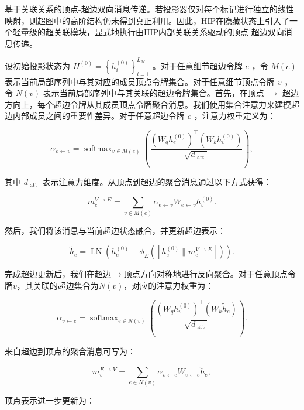 \documentclass[10pt]{article}
\begin{document}
基于关联关系的顶点-超边双向消息传递。若投影器仅对每个标记进行独立的线性映射，则超图中的高阶结构仍未得到真正利用。因此，HIP在隐藏状态上引入了一个轻量级的超关联模块，显式地执行由HIP内部关联关系驱动的顶点-超边双向消息传递。

设初始投影状态为 \({H}^{\left( 0\right) } = {\left\{  {h}_{i}^{\left( 0\right) }\right\}  }_{i = 1}^{{L}_{\mathcal{H}}}\) 。对于任意细节超边令牌 \(e\) ，令 \(M\left( e\right)\) 表示当前局部序列中与其对应的成员顶点令牌集合。对于任意细节顶点令牌 \(v\) ，令 \(N\left( v\right)\) 表示当前局部序列中与其关联的超边令牌集合。首先，在顶点 \(\rightarrow\) 超边方向上，每个超边令牌从其成员顶点令牌聚合消息。我们使用集合注意力来建模超边内部成员之间的重要性差异。对于任意超边令牌 \(e\) ，注意力权重定义为：

\[
{\alpha }_{e \leftarrow  v} = {\operatorname{softmax}}_{v \in  M\left( e\right) }\left( \frac{{\left( {W}_{q}{h}_{e}^{\left( 0\right) }\right) }^{\top }\left( {{W}_{k}{h}_{v}^{\left( 0\right) }}\right) }{\sqrt{{d}_{\text{ att }}}}\right) , \tag{5}
\]

其中 \({d}_{\text{ att }}\) 表示注意力维度。从顶点到超边的聚合消息通过以下方式获得：

\[
{m}_{e}^{V \rightarrow  E} = \mathop{\sum }\limits_{{v \in  M\left( e\right) }}{\alpha }_{e \leftarrow  v}{W}_{e \leftarrow  v}{h}_{v}^{\left( 0\right) }. \tag{6}
\]

然后，我们将该消息与当前超边状态融合，并更新超边表示：

\[
{\widetilde{h}}_{e} = \operatorname{LN}\left( {{h}_{e}^{\left( 0\right) } + {\phi }_{E}\left( \left\lbrack  {{h}_{e}^{\left( 0\right) }\parallel {m}_{e}^{V \rightarrow  E}}\right\rbrack  \right) }\right) . \tag{7}
\]

完成超边更新后，我们在超边\(\rightarrow\)顶点方向对称地进行反向聚合。对于任意顶点令牌\(v\)，其关联的超边集合为\(N\left( v\right)\)，对应的注意力权重为：

\[
{\alpha }_{v \leftarrow  e} = {\operatorname{softmax}}_{e \in  N\left( v\right) }\left( \frac{{\left( {W}_{q}{h}_{v}^{\left( 0\right) }\right) }^{\top }\left( {{W}_{k}{\widetilde{h}}_{e}}\right) }{\sqrt{{d}_{\text{ att }}}}\right) . \tag{8}
\]

来自超边到顶点的聚合消息可写为：

\[
{m}_{v}^{E \rightarrow  V} = \mathop{\sum }\limits_{{e \in  N\left( v\right) }}{\alpha }_{v \leftarrow  e}{W}_{v \leftarrow  e}{\widetilde{h}}_{e}, \tag{9}
\]

顶点表示进一步更新为：
\end{document}
